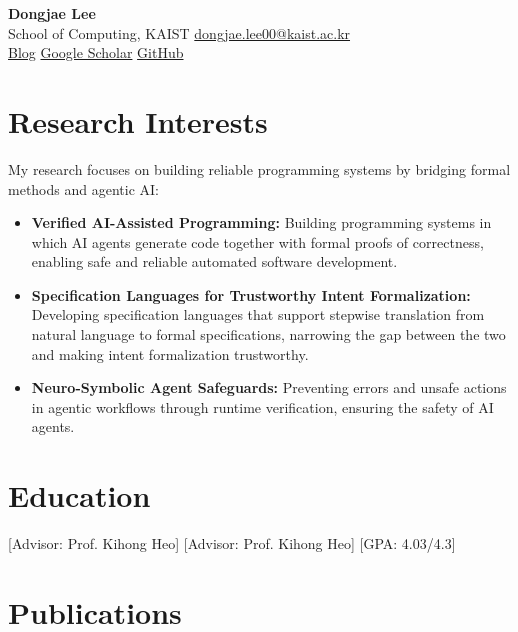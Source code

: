 \documentclass[10pt,letterpaper]{article}
\newlength{\cvheadersep}
\newenvironment{cventries}
  {\begin{itemize}[leftmargin=0pt, label={}, topsep=0pt, itemsep=6pt, parsep=0pt, partopsep=0pt]}
  {\end{itemize}}
\newcommand{\cvemph}[1]{\textbf{#1}}
\newcommand{\cvname}[1]{{\LARGE\bfseries #1}}
\newcommand{\cvcontact}[1]{{\normalsize #1}}
\newcommand{\cvheader}[2]{
  \begin{center}
    \cvname{#1}\\[\cvheadersep]
    \cvcontact{#2}
  \end{center}
}
\begin{document}
\cvheader{Dongjae Lee}{School of Computing, KAIST \textbar{} \href{mailto:dongjae.lee00@kaist.ac.kr}{dongjae.lee00@kaist.ac.kr}\\
	\href{https://duncan020313.github.io/blog}{Blog} \textbar{} \href{https://scholar.google.com/citations?user=SdYMsSoAAAAJ&hl=ko}{Google Scholar} \textbar{} \href{https://github.com/duncan020313}{GitHub}}

\section*{Research Interests}
My research focuses on building reliable programming systems by bridging formal methods and agentic AI:
\begin{itemize}
	\item \cvemph{Verified AI-Assisted Programming:} Building programming systems in which AI agents generate code together with formal proofs of correctness, enabling safe and reliable automated software development.
	\item \cvemph{Specification Languages for Trustworthy Intent Formalization:} Developing specification languages that support stepwise translation from natural language to formal specifications, narrowing the gap between the two and making intent formalization trustworthy.
	\item \cvemph{Neuro-Symbolic Agent Safeguards:} Preventing errors and unsafe actions in agentic workflows through runtime verification, ensuring the safety of AI agents.
\end{itemize}
\section*{Education}
\begin{cventries}
	[Advisor: Prof. Kihong Heo]
	[Advisor: Prof. Kihong Heo]
	[GPA: 4.03/4.3]
\end{cventries}

\section*{Publications}
\end{document}
